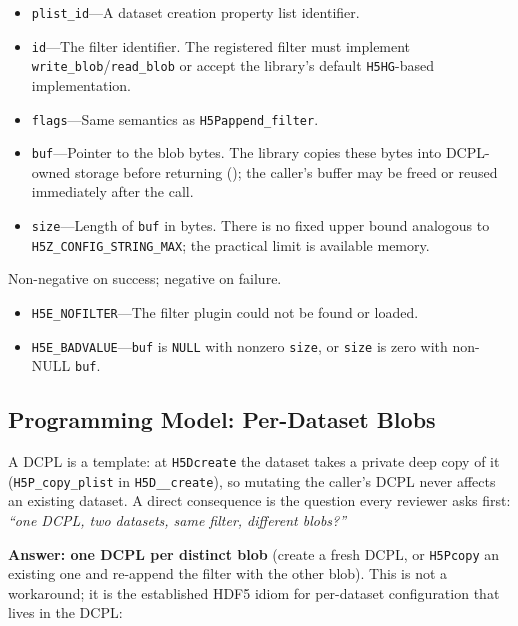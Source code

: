 \documentclass[../RFC-HDFG-2026-003.tex]{subfiles}
\begin{document}
\begin{itemize}
\item \texttt{plist\_id}---A dataset creation property list identifier.
\item \texttt{id}---The filter identifier. The registered filter must
  implement \texttt{write\_blob}/\texttt{read\_blob} or accept the
  library's default \texttt{H5HG}-based implementation.
\item \texttt{flags}---Same semantics as \texttt{H5Pappend\_filter}.
\item \texttt{buf}---Pointer to the blob bytes. The library copies these
  bytes into DCPL-owned storage before returning ();
  the caller's buffer may be freed or reused immediately after the call.
\item \texttt{size}---Length of \texttt{buf} in bytes. There is no fixed
  upper bound analogous to \texttt{H5Z\_CONFIG\_STRING\_MAX}; the
  practical limit is available memory.
\end{itemize}

Non-negative on success; negative on failure.

\begin{itemize}
\item \texttt{H5E\_NOFILTER}---The filter plugin could not be found or
  loaded.
\item \texttt{H5E\_BADVALUE}---\texttt{buf} is \texttt{NULL} with nonzero
  \texttt{size}, or \texttt{size} is zero with non-NULL \texttt{buf}.
\end{itemize}

\subsection{Programming Model: Per-Dataset Blobs}
\label{sec:blob-per-dataset}

A DCPL is a template: at \texttt{H5Dcreate} the dataset takes a private
deep copy of it (\texttt{H5P\_copy\_plist} in \texttt{H5D\_\_create}),
so mutating the caller's DCPL never affects an existing dataset. A
direct consequence is the question every reviewer asks first:
\emph{``one DCPL, two datasets, same filter, different blobs?''}

\noindent\textbf{Answer: one DCPL per distinct blob} (create a fresh
DCPL, or \texttt{H5Pcopy} an existing one and re-append the filter with
the other blob). This is not a workaround; it is the established HDF5
idiom for per-dataset configuration that lives in the DCPL:
\end{document}
